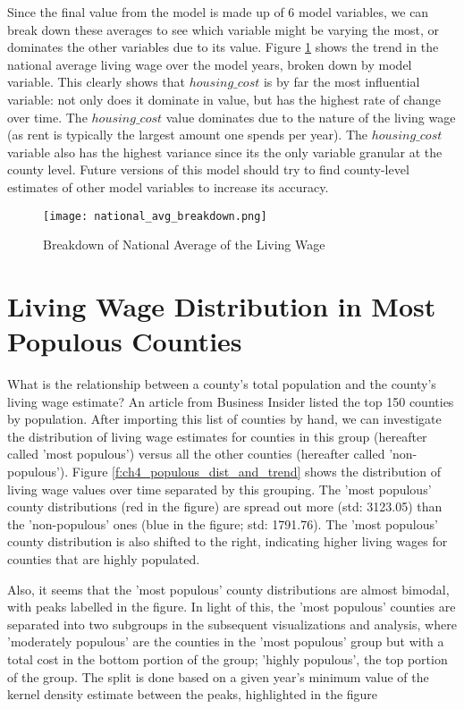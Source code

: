 Since the final value from the model is made up of 6 model variables, we can break down these averages to see which variable might be varying the most, or dominates the other variables due to its value. Figure \ref{f:ch4_national_avg_breakdown} shows the trend in the national average living wage over the model years, broken down by model variable. This clearly shows that $housing\_cost$ is by far the most influential variable: not only does it dominate in value, but has the highest rate of change over time. The $housing\_cost$ value dominates due to the nature of the living wage (as rent is typically the largest amount one spends per year). The $housing\_cost$ variable also has the highest variance since its the only variable granular at the county level. Future versions of this model should try to find county-level estimates of other model variables to increase its accuracy.

\begin{figure}[H]
    \centering
        \texttt{[image: national\_avg\_breakdown.png]}
        \caption{Breakdown of National Average of the Living Wage}
    \label{f:ch4_national_avg_breakdown}
\end{figure}




\section{Living Wage Distribution in Most Populous Counties}

What is the relationship between a county's total population and the county's living wage estimate? An article from Business Insider \cite{populated_counties} listed the top 150 counties by population. After importing this list of counties by hand, we can investigate the distribution of living wage estimates for counties in this group (hereafter called 'most populous') versus all the other counties (hereafter called 'non-populous'). Figure \ref{f:ch4_populous_dist_and_trend} shows the distribution of living wage values over time separated by this grouping. The 'most populous' county distributions (red in the figure) are spread out more (std: 3123.05) than the 'non-populous' ones (blue in the figure; std: 1791.76). The 'most populous' county distribution is also shifted to the right, indicating higher living wages for counties that are highly populated. 

Also, it seems that the 'most populous' county distributions are almost bimodal, with peaks labelled in the figure. In light of this, the 'most populous' counties are separated into two subgroups in the subsequent visualizations and analysis, where 'moderately populous' are the counties in the 'most populous' group but with a total cost in the bottom portion of the group; 'highly populous', the top portion of the group. The split is done based on a given year's minimum value of the kernel density estimate between the peaks, highlighted in the figure

